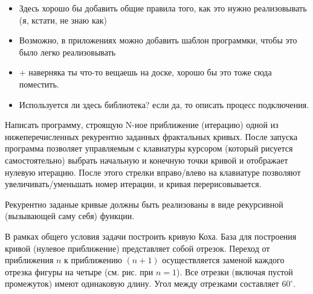 
\begin{itemize}
    \item Здесь хорошо бы добавить общие правила того, как это нужно реализовывать (я, кстати, не знаю как)
    \item Возможно, в приложениях можно добавить шаблон программки, чтобы это было легко реализовывать
    \item + наверняка ты что-то вещаешь на доске, хорошо бы это тоже сюда поместить.
    \item Используется ли здесь библиотека? если да, то описать процесс подключения. 
\end{itemize}
Написать программу, строящую N-ное приближение (итерацию) одной из 
нижеперечисленных рекурентно заданных фрактальных кривых. После запуска 
программа позволяет управляемым с клавиатуры курсором (который рисуется 
самостоятельно) выбрать начальную и конечную точки кривой и отображает нулевую 
итерацию. После этого стрелки вправо/влево на клавиатуре позволяют 
увеличивать/уменьшать номер итерации, и кривая перерисовывается.

Рекурентно заданые кривые должны быть реализованы в виде рекурсивной (вызывающей 
саму себя) функции.


\begin{zztask}
В рамках общего условия задачи построить кривую Коха. База для построения кривой
(нулевое приближение) представляет собой отрезок. Переход от приближения
$n$ к приближению $(n+1)$ осуществляется заменой каждого отрезка фигуры на четыре
(см. рис. при $n=1$). Все отрезки (включая пустой промежуток) имеют одинаковую 
длину. Угол между отрезками составляет $60^\circ$.
\par
\end{zztask}

